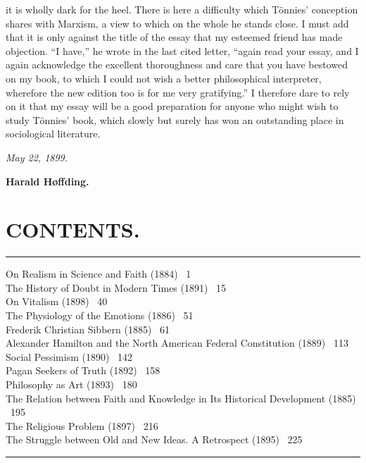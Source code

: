 \documentclass[12pt,a4paper,openany]{book}
\newcommand{\opage}[1]{\marginnote{\footnotesize\textit{[#1]}}}
\newcommand{\streg}{\begin{center}\rule{3em}{0.4pt}\end{center}}
\begin{document}
it is wholly dark for the heel. There is here a
difficulty which Tönnies' conception shares with Marxism, a
view to which on the whole he stands close. I must add that
it is only against the title of the essay that my esteemed friend
\opage{VIII}has made objection. ``I have,'' he wrote in the last
cited letter, ``again read your essay, and I again acknowledge
the excellent thoroughness and care that you have
bestowed on my book, to which I could not wish a better
philosophical interpreter, wherefore the new edition too is
for me very gratifying.'' I therefore dare to rely on it that my essay
will be a good preparation for anyone who might wish to
study Tönnies' book, which slowly but surely has
won an outstanding place in sociological literature.

\emph{May 22, 1899.}

\textbf{Harald Høffding.}


\chapter*{CONTENTS.}
\streg{}
\begin{flushleft}
On Realism in Science and Faith (1884) \dotfill\ 1\\
The History of Doubt in Modern Times (1891) \dotfill\ 15\\
On Vitalism (1898) \dotfill\ 40\\
The Physiology of the Emotions (1886) \dotfill\ 51\\
Frederik Christian Sibbern (1885) \dotfill\ 61\\
Alexander Hamilton and the North American Federal Constitution (1889) \dotfill\ 113\\
Social Pessimism (1890) \dotfill\ 142\\
Pagan Seekers of Truth (1892) \dotfill\ 158\\
Philosophy as Art (1893) \dotfill\ 180\\
The Relation between Faith and Knowledge in Its Historical Development (1885) \dotfill\ 195\\
The Religious Problem (1897) \dotfill\ 216\\
The Struggle between Old and New Ideas. A Retrospect (1895) \dotfill\ 225\\
\end{flushleft}
\begin{center}\rule{10em}{0.4pt}\end{center}

\mainmatter
\end{document}
